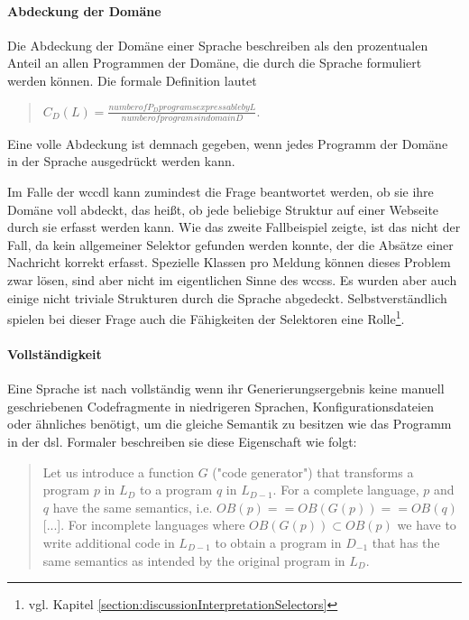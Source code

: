     \paragraph{Abdeckung der Domäne}
    Die Abdeckung der Domäne einer Sprache beschreiben
    \citet[Kapitel 4.2]{voelter:DslEngineering} als den
    prozentualen Anteil an allen Programmen der Domäne,
    die durch die Sprache formuliert werden können.
    Die formale Definition lautet

    \begin{quote}
        $C_D(L) = \frac{number of P_D programs expressable by L}{number of programs in domain D}$.
    \end{quote}

    Eine volle Abdeckung ist demnach gegeben,
    wenn jedes Programm der Domäne in der Sprache ausgedrückt werden kann.

    Im Falle der \gls{wccdl} kann zumindest die Frage beantwortet werden,
    ob sie ihre Domäne voll abdeckt, das heißt, ob jede beliebige Struktur auf einer Webseite
    durch sie erfasst werden kann.
    Wie das zweite Fallbeispiel zeigte, ist das nicht der Fall,
    da kein allgemeiner Selektor gefunden werden konnte,
    der die Absätze einer Nachricht korrekt erfasst.
    Spezielle Klassen pro Meldung können dieses Problem zwar lösen,
    sind aber nicht im eigentlichen Sinne des \glspl{wccs}.
    Es wurden aber auch einige nicht triviale Strukturen durch die Sprache abgedeckt.
    Selbstverständlich spielen bei dieser Frage auch die Fähigkeiten der Selektoren
    eine Rolle\footnote{vgl. Kapitel \ref{section:discussionInterpretationSelectors}}.

    \paragraph{Vollständigkeit}
    Eine Sprache ist nach \citet[Kapitel 4.5]{voelter:DslEngineering}
    vollständig wenn ihr Generierungsergebnis keine manuell geschriebenen Codefragmente in niedrigeren Sprachen,
    Konfigurationsdateien oder ähnliches benötigt,
    um die gleiche Semantik zu besitzen wie das Programm in der \gls{dsl}.
    Formaler beschreiben sie diese Eigenschaft wie folgt:

    \begin{quote}
        Let us introduce a function $G$ ("code generator") that transforms
        a program $p$ in $L_D$ to a program $q$ in $L_{D-1}$.
        For a complete language, $p$ and $q$ have the same semantics, i.e.
        $OB(p) == OB(G(p)) == OB(q)$ [...]. For incomplete languages
        where $OB(G(p)) \subset OB(p)$ we have to write additional
        code in $L_{D-1}$ to obtain a program in $D_{-1}$ that has the same semantics
        as intended by the original program in $L_D$.
    \end{quote}

